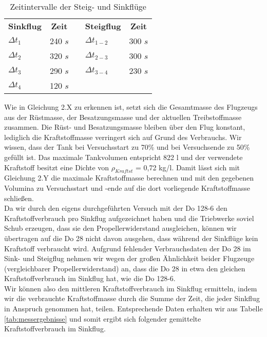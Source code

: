 \begin{table}[h]
	\centering
	\begin{tabular}{|l|c|clc}
		\cline{1-2} \cline{4-5}
		\textbf{Sinkflug} & \textbf{Zeit} & \multicolumn{1}{c|}{} & \multicolumn{1}{l|}{\textbf{Steigflug}} & \multicolumn{1}{c|}{\textbf{Zeit}} \\ \cline{1-2} \cline{4-5} 
		$\Delta t_1$      & 240 $s$       & \multicolumn{1}{c|}{} & \multicolumn{1}{l|}{$\Delta t_{1-2}$}   & \multicolumn{1}{c|}{300 $s$}         \\ \cline{1-2} \cline{4-5} 
		$\Delta t_2$      & 320 $s$       & \multicolumn{1}{c|}{} & \multicolumn{1}{l|}{$\Delta t_{2-3}$}   & \multicolumn{1}{c|}{300 $s$}         \\ \cline{1-2} \cline{4-5} 
		$\Delta t_3$      & 290 $s$       & \multicolumn{1}{c|}{} & \multicolumn{1}{l|}{$\Delta t_{3-4}$}   & \multicolumn{1}{c|}{230 $s$}         \\ \cline{1-2} \cline{4-5} 
		$\Delta t_4$      & 120 $s$       &                       &                                         &                                    \\ \cline{1-2}
	\end{tabular}
	\caption{Zeitintervalle der Steig- und Sinkflüge}
	\label{tab:do28-deltat}
\end{table}
\vspace{0.3cm} 

\noindent Wie in Gleichung 2.X zu erkennen ist, setzt sich die Gesamtmasse des Flugzeugs aus der Rüstmasse, der Besatzungsmasse und der aktuellen Treibstoffmasse zusammen. Die Rüst- und Besatzungsmasse bleiben über den Flug konstant, lediglich die Kraftstoffmasse verringert sich auf Grund des Verbrauchs. Wir wissen, dass der Tank bei Versuchsstart zu 70\% und bei Versuchsende zu 50\% gefüllt ist. Das maximale Tankvolumen entspricht 822 {l} und der verwendete Kraftstoff besitzt eine Dichte von $\rho_{Kraftst}$ = 0,72 {kg/l}. Damit lässt sich mit Gleichung 2.Y die maximale Kraftstoffmasse berechnen und mit den gegebenen Volumina zu Versuchsstart und -ende auf die dort vorliegende Kraftstoffmasse schließen.
\\
Da wir durch den eigens durchgeführten Versuch mit der Do 128-6 den Kraftstoffverbrauch pro Sinkflug aufgezeichnet haben und die Triebwerke soviel Schub erzeugen, dass sie den Propellerwiderstand ausgleichen, können wir übertragen auf die Do 28 nicht davon ausgehen, dass während der Sinkflüge kein Kraftstoff verbraucht wird. Aufgrund fehlender Verbrauchsdaten der Do 28 im Sink- und Steigflug nehmen wir wegen der großen Ähnlichkeit beider Flugzeuge (vergleichbarer Propellerwiderstand) an, dass die Do 28 in etwa den gleichen Kraftstoffverbrauch im Sinkflug hat, wie die Do 128-6.
\\
Wir können also den mittleren Kraftstoffverbrauch im Sinkflug ermitteln, indem wir die verbrauchte Kraftstoffmasse durch die Summe der Zeit, die jeder Sinkflug in Anspruch genommen hat, teilen. Entsprechende Daten erhalten wir aus Tabelle \ref{tab:messergebnisse} und somit ergibt sich folgender gemittelte Kraftstoffverbrauch im Sinkflug.

